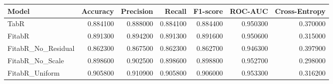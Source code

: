 \begin{tabular}{lrrrrrr}
\toprule
Model & Accuracy & Precision & Recall & F1-score & ROC-AUC & Cross-Entropy \\
\midrule
TabR & 0.884100 & 0.888000 & 0.884100 & 0.884400 & 0.950300 & 0.370000 \\
FitabR & 0.891300 & 0.894200 & 0.891300 & 0.891600 & 0.950600 & 0.315000 \\
FitabR_No_Residual & 0.862300 & 0.867500 & 0.862300 & 0.862700 & 0.946300 & 0.397900 \\
FitabR_No_Scale & 0.898600 & 0.902500 & 0.898600 & 0.898800 & 0.952700 & 0.298000 \\
FitabR_Uniform & 0.905800 & 0.910900 & 0.905800 & 0.906000 & 0.953300 & 0.316200 \\
\bottomrule
\end{tabular}
